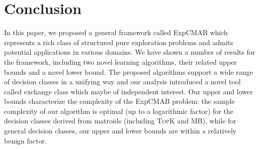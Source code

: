 \documentclass{article}
\newcommand{\Algorithm}{{\small \textsf{CGapExp}}\xspace}
\newcommand{\AlgorithmBud}{{\small \textsf{CGapKill}}\xspace}
\newcommand{\Problem}{{\small \textsf{ExpCMAB}}\xspace}
\newcommand{\MultiIdent}{\textsc{TopK}\xspace}
\newcommand{\MultiBandit}{\textsc{MB}\xspace}
\begin{document}
\section{Conclusion}
In this paper, we proposed a general framework called \Problem which represents a rich class of structured pure exploration problems and admits potential applications in various domains.
We have shown a number of results for the framework, including two novel learning algorithms, their related upper bounds and a novel lower bound.
The proposed algorithms support a wide range of decision classes in a unifying way and our analysis introduced a novel tool called exchange class which maybe of independent interest.
Our upper and lower bounds characterize the complexity of the \Problem problem: the sample complexity of our algorithm is optimal (up to a logarithmic factor) for the decision classes derived from matroids (including \MultiIdent and \MultiBandit), while for general decision classes, our upper and lower bounds are within a relatively benign factor.





\newpage



\newpage
\appendix

\maketitle
\end{document}
